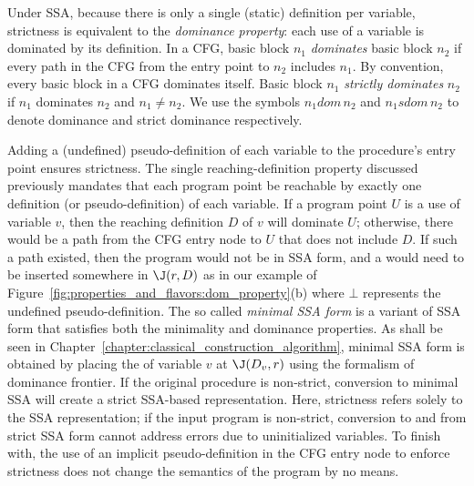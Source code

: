 Under SSA, because there is only a single
(static) definition per variable, strictness is equivalent to the
\emph{dominance property}: each use of a variable is dominated by
its definition.
In a CFG, basic block $n_{1}$ \emph{dominates} basic block $n_{2}$
if every path in the CFG from the entry point to $n_{2}$ includes
$n_{1}$. By convention, every basic block in a CFG dominates itself. Basic 
block $n_{1}$ \emph{strictly dominates} $n_{2}$ if $n_{1}$ dominates
$n_{2}$ and $n_{1} \neq n_{2}$. We use the symbols $n_{1} dom\, n_{2}$
and $n_{1} sdom\, n_{2}$ to denote dominance and strict dominance 
respectively.


Adding a (undefined) pseudo-definition of each variable to the procedure's entry
point ensures strictness. 
The single reaching-definition property discussed previously mandates that each
program point be reachable by exactly one definition (or pseudo-definition)
of each variable. If a program point $U$ is a use of variable $v$, then the
reaching definition $D$ of $v$ will dominate $U$; otherwise, there would be a path
from the CFG entry node to $U$ that does not include $D$. If such a  path existed, then the program would not be in SSA form, and a \phifun would need to be inserted somewhere
in $\J(r,D)$ as in our example of Figure~\ref{fig:properties_and_flavors:dom_property}(b) where $\bot$ represents the undefined pseudo-definition. The so called \emph{minimal SSA form} is a variant of SSA form that satisfies both the minimality and dominance properties. As shall be seen in Chapter~\ref{chapter:classical_construction_algorithm}, minimal SSA form is obtained by placing the \phifuns of variable $v$ at $\J(D_v,r)$ using the formalism of dominance frontier.
If the original procedure is non-strict, conversion to minimal SSA
will create a strict SSA-based representation. Here, strictness refers
solely to the SSA representation; if the input program is non-strict,
conversion to and from strict SSA form cannot address errors due
to uninitialized variables. To finish with, the use of an implicit pseudo-definition in the CFG entry node to enforce strictness does not change the semantics of the program by no means.



